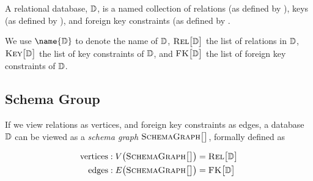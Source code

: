 	\begin{defn}
	\label{def:relational-database}
		A relational database, $\mathbb{D}$, is a named collection of relations (as defined by ), keys (as defined by ), and foreign key constraints (as defined by .
		
		We use $\name{\db}$ to denote the name of $\mathbb{D}$, $\textsc{Rel}\bigl[\mathbb{D}\bigr]$ the list of relations in $\mathbb{D}$, $\textsc{Key}\bigl[\mathbb{D}\bigr]$ the list of key constraints of $\mathbb{D}$, and $\textsc{FK}\bigl[\mathbb{D}\bigr]$ the list of foreign key constraints of $\mathbb{D}$.
	\end{defn}
	
	\subsection{Schema Group}
		\begin{defn}
			If we view relations as vertices, and foreign key constraints as edges, a database $\mathbb{D}$ can be viewed as a \emph{schema graph} $\textsc{SchemaGraph}\bigl[\bigr]$, formally defined as
			
			\begin{align}
				\mathrm{vertices}:  V\bigl(\textsc{SchemaGraph}\bigl[\bigr]\bigr) &= \textsc{Rel}\bigl[\mathbb{D}\bigr] \\
				\mathrm{edges}:  E\bigl(\textsc{SchemaGraph}\bigl[\bigr]\bigr) &= \textsc{FK}\bigl[\mathbb{D}\bigr]
			\end{align}
		\end{defn}
		

